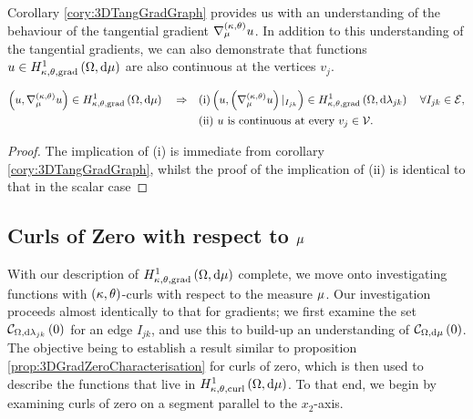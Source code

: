 Corollary \ref{cory:3DTangGradGraph} provides us with an understanding of the behaviour of the tangential gradient $\nabla^{\left( \kappa, \theta \right)}_{\mu}u$.
In addition to this understanding of the tangential gradients, we can also demonstrate that functions $u\in H^1_{\kappa,\theta,\mathrm{grad}}\left( \Omega, \mathrm{d}\mu \right)$ are also continuous at the vertices $v_j$.
\begin{prop} \label{prop:3DVertexContinuity-Grad}
	\begin{align*}
		\left( u, \nabla^{\left( \kappa, \theta \right)}_{\mu}u \right)\in H^1_{\kappa,\theta,\mathrm{grad}}\left( \Omega, \mathrm{d}\mu \right) \quad\Rightarrow\quad
		&\mathrm{(i)} \left( u, \left( \nabla^{\left( \kappa, \theta \right)}_{\mu} u \right)\vert_{I_{jk}}  \right)\in H^1_{\kappa,\theta,\mathrm{grad}}\left( \Omega, \mathrm{d}\lambda_{jk} \right) \quad \forall I_{jk}\in\mathcal{E}, \\
		&\mathrm{(ii)} \ u \text{ is continuous at every } v_j\in\mathcal{V}.
	\end{align*}
\end{prop}
\begin{proof}
	The implication of (i) is immediate from corollary \ref{cory:3DTangGradGraph}, whilst the proof of the implication of (ii) is identical to that in the scalar case 
\end{proof}

\subsection{Curls of Zero with respect to $\mu$} \label{apps:CurlsOfZero}
With our description of $H^1_{\kappa,\theta,\mathrm{grad}}\left( \Omega, \mathrm{d}\mu \right)$ complete, we move onto investigating functions with $\left( \kappa, \theta \right)$-curls with respect to the measure $\mu$.
Our investigation proceeds almost identically to that for gradients; we first examine the set $\mathcal{C}_{ \Omega, \mathrm{d}\lambda_{jk}}\left( 0 \right)$ for an edge $I_{jk}$, and use this to build-up an understanding of $\mathcal{C}_{ \Omega, \mathrm{d}\mu}\left( 0 \right)$.
The objective being to establish a result similar to proposition \ref{prop:3DGradZeroCharacterisation} for curls of zero, which is then used to describe the functions that live in $H^1_{\kappa,\theta,\mathrm{curl}}\left( \Omega, \mathrm{d}\mu \right)$.
To that end, we begin by examining curls of zero on a segment parallel to the $x_2$-axis.

